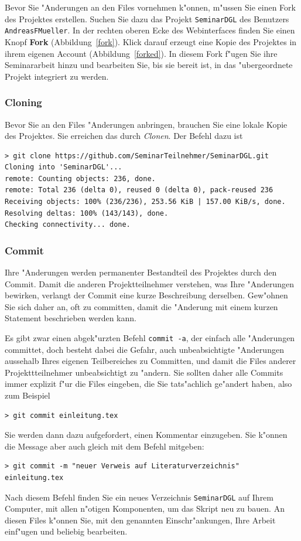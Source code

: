 \documentclass[a4paper,12pt]{article}
\begin{document}
Bevor Sie "Anderungen an den Files vornehmen k"onnen, m"ussen Sie
einen Fork des Projektes erstellen.
Suchen Sie dazu das Projekt \texttt{SeminarDGL} des Benutzers
\texttt{AndreasFMueller}.
In der rechten oberen Ecke des Webinterfaces finden Sie einen Knopf
\textbf{Fork} (Abbildung~\ref{fork}).
Klick darauf erzeugt eine Kopie des Projektes in ihrem eigenen Account
(Abbildung~\ref{forked}).
In diesem Fork f"ugen Sie ihre Seminararbeit hinzu und bearbeiten
Sie, bis sie bereit ist, in das "ubergeordnete Projekt integriert
zu werden.

\subsubsection{Cloning}
Bevor Sie an den Files "Anderungen anbringen, brauchen Sie eine 
lokale Kopie des Projektes.
Sie erreichen das durch {\em Clonen}.
Der Befehl dazu ist
\begin{verbatim}
> git clone https://github.com/SeminarTeilnehmer/SeminarDGL.git
Cloning into 'SeminarDGL'...
remote: Counting objects: 236, done.
remote: Total 236 (delta 0), reused 0 (delta 0), pack-reused 236
Receiving objects: 100% (236/236), 253.56 KiB | 157.00 KiB/s, done.
Resolving deltas: 100% (143/143), done.
Checking connectivity... done.
\end{verbatim}


\subsubsection{Commit}
Ihre "Anderungen werden permanenter Bestandteil des Projektes durch 
den Commit.
Damit die anderen Projektteilnehmer verstehen, was Ihre "Anderungen
bewirken, verlangt der Commit eine kurze Beschreibung derselben.
Gew"ohnen Sie sich daher an, oft zu committen, damit die "Anderung
mit einem kurzen Statement beschrieben werden kann.

Es gibt zwar einen abgek"urzten Befehl \texttt{commit -a}, der einfach
alle "Anderungen committet, doch besteht dabei die Gefahr, auch
unbeabsichtigte "Anderungen aussehalb Ihres eigenen Teilbereiches zu 
Committen, und damit die Files anderer Projekttteilnehmer unbeabsichtigt
zu "andern.
Sie sollten daher alle Commits immer explizit f"ur die Files eingeben,
die Sie tats"achlich ge"andert haben, also zum Beispiel
\begin{verbatim}
> git commit einleitung.tex
\end{verbatim}
Sie werden dann dazu aufgefordert, einen Kommentar einzugeben. 
Sie k"onnen die Message aber auch gleich mit dem Befehl mitgeben:
\begin{verbatim}
> git commit -m "neuer Verweis auf Literaturverzeichnis" einleitung.tex
\end{verbatim}
Nach diesem Befehl finden Sie ein neues Verzeichnis \texttt{SeminarDGL}
auf Ihrem Computer, mit allen n"otigen Komponenten, um das Skript
neu zu bauen.
An diesen Files k"onnen Sie, mit den genannten Einschr"ankungen,
Ihre Arbeit einf"ugen und beliebig bearbeiten.
\end{document}
